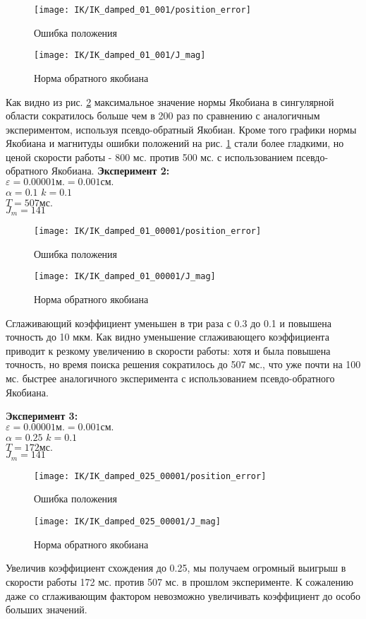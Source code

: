\begin{figure}[h!]
	\centering
	\texttt{[image: IK/IK\_damped\_01\_001/position\_error]}
	\caption{Ошибка положения}
	\label{fig:4_5_1}
\end{figure}
\begin{figure}[h!]
	\centering
	\texttt{[image: IK/IK\_damped\_01\_001/J\_mag]}
	\caption{Норма обратного якобиана}
	\label{fig:4_5_2}
\end{figure}
Как видно из рис. \ref{fig:4_5_2} максимальное значение нормы Якобиана в сингулярной области сократилось больше чем в 200 раз по сравнению с аналогичным экспериментом, используя псевдо-обратный Якобиан. Кроме того графики нормы Якобиана и магнитуды ошибки положений на рис. \ref{fig:4_5_1} стали более гладкими, но ценой скорости работы - 800 мс. против 500 мс. с использованием псевдо-обратного Якобиана.
\bigbreak
\textbf{Эксперимент 2:}\\
$\varepsilon = 0.00001\text{м.} = 0.001\text{см.}$\\
$\alpha = 0.1$
$k = 0.1$\\
$T = 507 \text{мс.}$\\
$J_{m} = 141$

\begin{figure}[h!]
	\centering
	\texttt{[image: IK/IK\_damped\_01\_00001/position\_error]}
	\caption{Ошибка положения}
	\label{fig:4_5_3}
\end{figure}
\begin{figure}[h!]
	\centering
	\texttt{[image: IK/IK\_damped\_01\_00001/J\_mag]}
	\caption{Норма обратного якобиана}
	\label{fig:4_5_4}
\end{figure}
Сглаживающий коэффициент уменьшен в три раза с 0.3 до 0.1 и повышена точность до 10 мкм. Как видно уменьшение сглаживающего коэффициента приводит к резкому увеличению в скорости работы: хотя и была повышена точность, но время поиска решения сократилось до 507 мс., что уже почти на 100 мс. быстрее аналогичного эксперимента с использованием псевдо-обратного Якобиана.

\textbf{Эксперимент 3:}\\
$\varepsilon = 0.00001\text{м.} = 0.001\text{см.}$\\
$\alpha = 0.25$
$k = 0.1$\\
$T = 172 \text{мс.}$\\
$J_{m} = 141$

\begin{figure}[h!]
	\centering
	\texttt{[image: IK/IK\_damped\_025\_00001/position\_error]}
	\caption{Ошибка положения}
	\label{fig:4_5_5}
\end{figure}
\begin{figure}[h!]
	\centering
	\texttt{[image: IK/IK\_damped\_025\_00001/J\_mag]}
	\caption{Норма обратного якобиана}
	\label{fig:4_5_6}
\end{figure}
Увеличив коэффициент схождения до 0.25, мы получаем огромный выигрыш в скорости работы 172 мс. против 507 мс. в прошлом эксперименте. К сожалению даже со сглаживающим фактором невозможно увеличивать коэффициент до особо больших значений.

